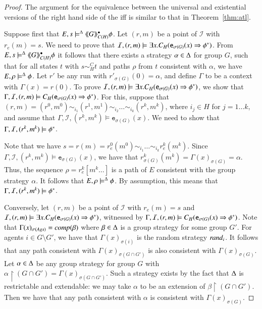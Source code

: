 \documentclass[a4wide]{article}
\theoremstyle{examplesty}
\newcommand{\strat}{\sigma}
\newcommand{\Ags}{\mathit{Ags}}
\newcommand{\I}{\mathcal{I}}
\newcommand{\atlop}[1]{\langle\hspace{-2pt}\langle #1 \rangle \hspace{-2pt}\rangle }
\newcommand{\existsg}[1]{\exists #1.}
\newcommand{\lid}[2]{\mathtt{e}_{#1}(#2)}
\newcommand{\rimp}{\Rightarrow}
\newcommand{\Env}{E}
\newcommand{\restrict}{\upharpoonright}
\begin{document}
\begin{proof} 
The argument for the equivalence between the universal and existential versions of the right hand side of
the iff is similar to that 
in Theorem~\ref{thm:atl}. 

Suppose first that  $\Env, s \models^\GStrats \atlop{G}^\bullet_{C(H)}\phi$. 
 Let $(r,m)$ be a  point of $\I$ with $r_e(m) =s$. We need to prove that  $ \I,(r,m) \models \existsg{x} C_{H}(\lid{\strat(G)}{x} \rimp \trl{\phi})$. 
From  $\Env, s \models^\GStrats \atlop{G}^\bullet_{C(H)}\phi$ it follows that there exists a 
strategy $\alpha\in \Delta$ for group $G$, such that  for all states $t$ with $s \sim^C_H t$ and paths $\rho$ from $t$
consistent with $\alpha$, 
we have 
$\Env, \rho \models^\GStrats \phi$. 
Let $r'$ be any run with $r'_{\strat(G)}(0) = \alpha$, and define $\Gamma$ to be a context with $\Gamma(x) = r(0)$. 
To prove $ \I,(r,m) \models \existsg{x} C_{H}(\lid{\strat(G)}{x} \rimp \trl{\phi})$, we 
show that $\Gamma, \I,(r,m) \models C_{H}(\lid{\strat(G)}{x} \rimp \trl{\phi})$. 
For this, suppose that 
$(r,m) = (r^0,m^0) \sim_{i_1} (r^1,m^1)  \sim_{i_2} \ldots \sim_{i_k} (r^k,m^k)$, where $i_j \in H$ for $j = 1\ldots k$, 
and assume that $\Gamma, \I,(r^k,m^k) \models \lid{\strat(G)}{x}$. 
We need to show that $\Gamma, \I,(r^k,m^k) \models \trl{\phi}$. 

Note that we have $s = r(m) = r^0_e(m^0) \sim_{i_1} \ldots \sim_{i_k} r^k_e(m^k)$.  
Since $\Gamma, \I,(r^k,m^k) \models \lid{\strat(G)}{x}$, we have that $r^k_{\strat(G)}(m^k) = 
\Gamma(x)_{\strat(G)} = \alpha$. 
Thus, the sequence $\rho = r^k_e[m^k\ldots]$ is a path of $\Env$ consistent with the 
group strategy $\alpha$. It follows that 
$\Env, \rho \models^\GStrats \phi$. By assumption, this means that $\Gamma, \I,(r^k,m^k) \models  \trl{\phi}$. 

Conversely, let $(r,m)$ be a point of  $\I$ with $r_e(m) = s$ and  $ \I, (r,m)\models \existsg{x}  C_{H}(\lid{\strat(G)}{x} \rimp \trl{\phi})$, 
witnessed by  $\Gamma, \I, (r,m)\models   C_{H}(\lid{\strat(G)}{x} \rimp \trl{\phi})$. 
Note that $\Gamma(x)_{\strat(\Ags)} = \compl{\beta}$ where $\beta\in \Delta$ is a group strategy for some group 
$G'$.  For agents $i \in G\setminus G'$, we have that $\Gamma(x)_{\strat(i)}$ is the random strategy  $\mathit{rand}_i$.  
It follows that any path consistent with  $\Gamma(x)_{\strat(G\cap G')}$ is also consistent with $\Gamma(x)_{\strat(G)}$. 
Let $\alpha \in \Delta$ be any group strategy for group $G$  with 
$\alpha\restrict (G\cap G') = \Gamma(x)_{\strat(G\cap G')}$. 
Such a strategy exists by the fact that $\Delta$ is restrictable and extendable: 
we may take $\alpha$ to be an extension of $\beta\restrict (G\cap G')$. 
 Then we have that any path consistent with $\alpha$ is 
consistent with $\Gamma(x)_{\strat(G)}$.


\end{proof}
\end{document}
